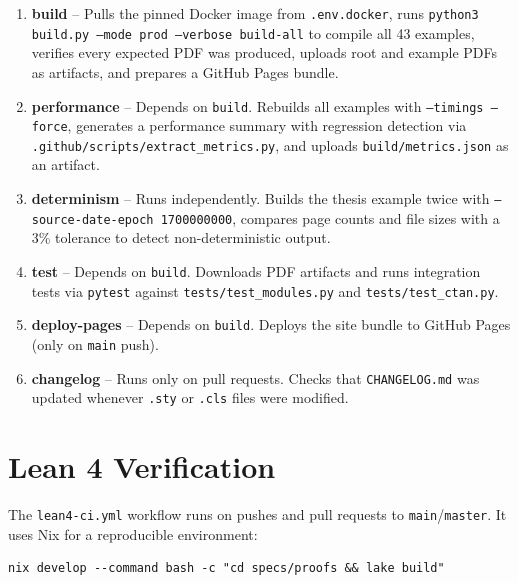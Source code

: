 \begin{enumerate}
  \item \textbf{build} -- Pulls the pinned Docker image from
        \texttt{.env.docker}, runs
        \texttt{python3 build.py --mode prod --verbose build-all} to compile
        all 43 examples, verifies every expected PDF was produced, uploads
        root and example PDFs as artifacts, and prepares a GitHub Pages
        bundle.

  \item \textbf{performance} -- Depends on \texttt{build}.  Rebuilds all
        examples with \texttt{--timings --force}, generates a performance
        summary with regression detection via
        \texttt{.github/scripts/extract_metrics.py}, and uploads
        \texttt{build/metrics.json} as an artifact.

  \item \textbf{determinism} -- Runs independently.  Builds the thesis
        example twice with \texttt{--source-date-epoch 1700000000},
        compares page counts and file sizes with a 3\% tolerance to detect
        non-deterministic output.

  \item \textbf{test} -- Depends on \texttt{build}.  Downloads PDF
        artifacts and runs integration tests via \texttt{pytest} against
        \texttt{tests/test\_modules.py} and \texttt{tests/test\_ctan.py}.

  \item \textbf{deploy-pages} -- Depends on \texttt{build}.  Deploys the
        site bundle to GitHub Pages (only on \texttt{main} push).

  \item \textbf{changelog} -- Runs only on pull requests.  Checks that
        \texttt{CHANGELOG.md} was updated whenever \texttt{.sty} or
        \texttt{.cls} files were modified.
\end{enumerate}

\section{Lean 4 Verification}

The \texttt{lean4-ci.yml} workflow runs on pushes and pull requests to
\texttt{main}/\texttt{master}.  It uses Nix for a reproducible environment:

\begin{verbatim}
nix develop --command bash -c "cd specs/proofs && lake build"
\end{verbatim}

